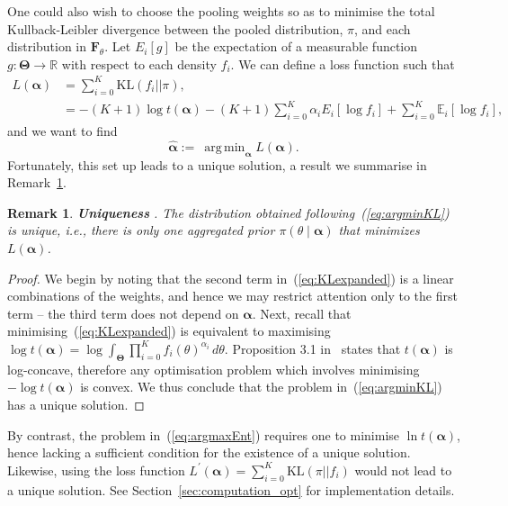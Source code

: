 \documentclass[a4paper, notitlepage, 10pt]{article}
\DeclareMathOperator*{\argmin}{arg\,min}
\newtheorem{remark}{Remark}[]
\begin{document}
One could also wish to choose the pooling weights so as to minimise the total Kullback-Leibler divergence between the pooled distribution, $\pi$, and each distribution in $\mathbf{F}_{\theta}$.
Let $E_i[g]$ be the expectation of a measurable function $g: \boldsymbol{\Theta} \to \mathbb{R}$ with respect to each density $f_i$.
We can define a loss function such that
\begin{align}
\nonumber
L(\boldsymbol\alpha) &= \sum_{i=0}^K  \text{KL}(f_i || \pi ), \\
\label{eq:KLexpanded}
     &= - (K+1)\log t(\boldsymbol\alpha) - (K+1) \sum_{i=0}^K\alpha_i E_i [\log f_i ]  + \sum_{i=0}^K \mathbb{E}_i\left[\log f_i\right], 
\end{align}
and we want to find 
\begin{equation}
\label{eq:argminKL}
    \hat{\boldsymbol\alpha}:= \:\argmin_{\boldsymbol\alpha} L(\boldsymbol\alpha).   
\end{equation}
Fortunately, this set up leads to a unique solution, a result we summarise in Remark~\ref{rmk:uniqueness}.
\begin{remark}
\label{rmk:uniqueness}
\textbf{Uniqueness} .
 The distribution obtained following~(\ref{eq:argminKL}) is unique, i.e., there is only one aggregated prior $\pi(\theta \mid \boldsymbol\alpha)$ that minimizes $L(\boldsymbol\alpha)$.
\end{remark}
\begin{proof}
We begin by noting that the second term in~(\ref{eq:KLexpanded}) is a linear combinations of the weights, and hence we may restrict attention only to the first term -- the third term does not depend on $\boldsymbol{\alpha}$.
Next, recall that minimising~(\ref{eq:KLexpanded}) is equivalent to maximising $\log t(\boldsymbol\alpha) = \log\int_{\boldsymbol\Theta}\prod_{i=0}^{K}f_i(\theta)^{\alpha_i}\, d\theta$.
Proposition 3.1 in~\cite{Rufo2012A} states that $t(\boldsymbol\alpha)$ is log-concave, therefore any optimisation problem which involves minimising $-\log t(\boldsymbol{\alpha})$ is convex.
We thus conclude that the problem in~(\ref{eq:argminKL}) has a unique solution.
\end{proof}
By contrast, the problem in~(\ref{eq:argmaxEnt}) requires one to minimise $\ln t(\boldsymbol\alpha)$, hence lacking a sufficient condition for the existence of a unique solution.
Likewise, using  the loss function $L^\prime(\boldsymbol\alpha) = \sum_{i=0}^K  \text{KL}(\pi ||f_i )$ would not lead to a unique solution.
See Section~\ref{sec:computation_opt} for implementation details.
\end{document}

